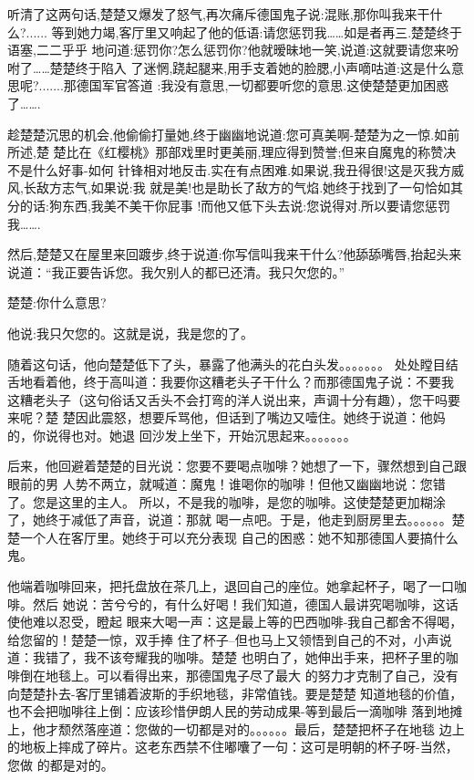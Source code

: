 听清了这两句话,楚楚又爆发了怒气,再次痛斥德国鬼子说:混账,那你叫我来干什么?......
等到她力竭,客厅里又响起了他的低语:请您惩罚我……如是者再三.楚楚终于语塞,二二乎乎
地问道:惩罚你?怎么惩罚你?他就暧昧地一笑,说道:这就要请您来吩咐了……楚楚终于陷入
了迷惘,跷起腿来,用手支着她的脸腮,小声嘀咕道:这是什么意思呢?.......那德国军官答道
:我没有意思,一切都要听您的意思.这使楚楚更加困惑了…….

趁楚楚沉思的机会,他偷偷打量她,终于幽幽地说道:您可真美啊-楚楚为之一惊.如前所述,楚
楚比在《红樱桃》那部戏里时更美丽,理应得到赞誉;但来自魔鬼的称赞决不是什么好事-如何
针锋相对地反击.实在有点困难.如果说,我丑得很!这是灭我方威风,长敌方志气,如果说:我
就是美!也是助长了敌方的气焰.她终于找到了一句恰如其分的话:狗东西,我美不美干你屁事
!而他又低下头去说:您说得对.所以要请您惩罚我…….

然后,楚楚又在屋里来回踱步,终于说道:你写信叫我来干什么?他舔舔嘴唇,抬起头来说道：“我正要告诉您。我欠别人的都已还清。我只欠您的。”

楚楚:你什么意思?

他说:我只欠您的。这就是说，我是您的了。

随着这句话，他向楚楚低下了头，暴露了他满头的花白头发。。。。。。。
处处瞠目结舌地看着他，终于高叫道：我要你这糟老头子干什么？而那德国鬼子说：不要我
这糟老头子（这句俗话又舌头不会打弯的洋人说出来，声调十分有趣），您干吗要来呢？楚
楚因此震怒，想要斥骂他，但话到了嘴边又噎住。她终于说道：他妈的，你说得也对。她退
回沙发上坐下，开始沉思起来。。。。。。。

后来，他回避着楚楚的目光说：您要不要喝点咖啡？她想了一下，骤然想到自己跟眼前的男
人势不两立，就喊道：魔鬼！谁喝你的咖啡！但他又幽幽地说：您错了。您是这里的主人。
所以，不是我的咖啡，是您的咖啡。这使楚楚更加糊涂了，她终于减低了声音，说道：那就
喝一点吧。于是，他走到厨房里去。。。。。。楚楚一个人在客厅里。她终于可以充分表现
自己的困惑：她不知那德国人要搞什么鬼。

他端着咖啡回来，把托盘放在茶几上，退回自己的座位。她拿起杯子，喝了一口咖啡。然后
她说：苦兮兮的，有什么好喝！我们知道，德国人最讲究喝咖啡，这话使他难以忍受，瞪起
眼来大喝一声：这是最上等的巴西咖啡-我自己都舍不得喝，给您留的！楚楚一惊，双手捧
住了杯子--但也马上又领悟到自己的不对，小声说道：我错了，我不该夸耀我的咖啡。楚楚
也明白了，她伸出手来，把杯子里的咖啡倒在地毯上。可以看得出来，那德国鬼子尽了最大
的努力才克制了自己，没有向楚楚扑去-客厅里铺着波斯的手织地毯，非常值钱。要是楚楚
知道地毯的价值，也不会把咖啡往上倒：应该珍惜伊朗人民的劳动成果-等到最后一滴咖啡
落到地摊上，他才颓然落座道：您做的一切都是对的。。。。。。最后，楚楚把杯子在地毯
边上的地板上摔成了碎片。这老东西禁不住嘟囔了一句：这可是明朝的杯子呀-当然，您做
的都是对的。


